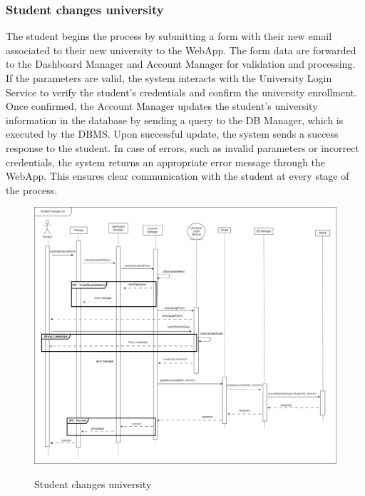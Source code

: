 \documentclass[a4paper,12pt]{article}
\begin{document}
\subsubsection*{Student changes university}
The student begins the process by submitting a form with their new email associated to their new university to the WebApp. The form data are forwarded to the Dashboard Manager and Account Manager for validation and processing. If the parameters are valid, the system interacts with the University Login Service to verify the student's credentials and confirm the university enrollment. Once confirmed, the Account Manager updates the student's university information in the database by sending a query to the DB Manager, which is executed by the DBMS. Upon successful update, the system sends a success response to the student.
In case of errors, such as invalid parameters or incorrect credentials, the system returns an appropriate error message through the WebApp. This ensures clear communication with the student at every stage of the process.
\begin{figure}[H]
\centering
\includegraphics[scale = 0.35]{DD_figures/RuntimeView/StudentChangesUniversityRV.drawio.png}\\
\caption{Student changes university}
\end{figure}
\end{document}

